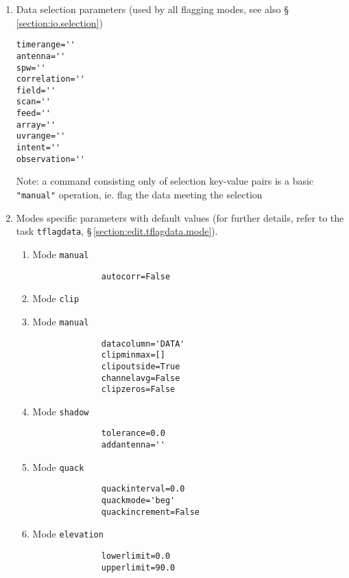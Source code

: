 \begin{enumerate}
        
\item Data selection parameters (used by all flagging modes, see also \S\,\ref{section:io.selection}) 

\small
\begin{verbatim}        
timerange='' 
antenna='' 
spw='' 
correlation='' 
field='' 
scan='' 
feed=''
array='' 
uvrange='' 
intent='' 
observation=''
\end{verbatim}
\normalsize
        

Note: a command consisting only of selection key-value pairs is a
basic {\tt "manual"} operation, ie. flag the data meeting the selection
          
        
\item Modes specific parameters with default values (for further details,
refer to the task {\tt tflagdata}, \S\,\ref{section:edit.tflagdata.mode}).
     
\begin{enumerate}
     
\item Mode {\tt manual}
\small
\begin{verbatim}
              autocorr=False
\end{verbatim}
\normalsize

\item Mode {\tt clip}
     
\item Mode {\tt manual}
\small
\begin{verbatim}
              datacolumn='DATA'
              clipminmax=[]  
              clipoutside=True
              channelavg=False  
              clipzeros=False
\end{verbatim}
\normalsize             

\item Mode {\tt shadow}
\small
\begin{verbatim}
              tolerance=0.0
              addantenna=''
\end{verbatim}
\normalsize  

\item Mode {\tt quack}
\small
\begin{verbatim}
              quackinterval=0.0     
              quackmode='beg' 
              quackincrement=False
\end{verbatim}
\normalsize  
              
\item Mode {\tt elevation}
\small
\begin{verbatim}
              lowerlimit=0.0
              upperlimit=90.0
\end{verbatim}
\normalsize  
              

\end{enumerate}
\end{enumerate}
